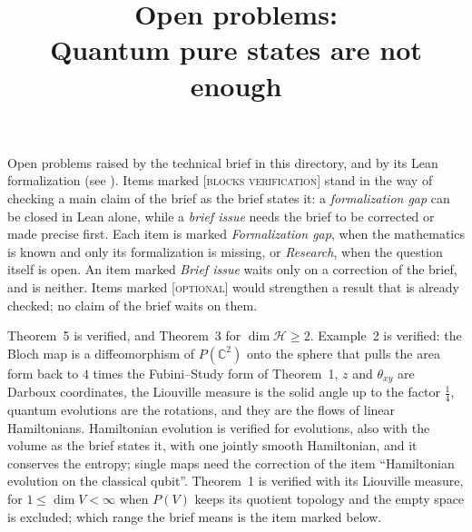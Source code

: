 \documentclass[11pt]{article}
\title{Open problems:\\ Quantum pure states are not enough}
\author{}
\date{}
\begin{document}
\maketitle

\noindent
Open problems raised by the technical brief in this directory, and by its Lean formalization
(see ).
Items marked \textsc{[blocks verification]} stand in the way of checking a main
claim of the brief as the brief states it: a \emph{formalization gap} can be closed
in Lean alone, while a \emph{brief issue} needs the brief to be corrected or made
precise first.
Each item is marked \emph{Formalization gap}, when the mathematics is known and only its
formalization is missing, or \emph{Research}, when the question itself is open. An item marked \emph{Brief issue} waits only on a correction of the
brief, and is neither. Items marked \textsc{[optional]} would strengthen a result that is already
checked; no claim of the brief waits on them.

Theorem~5 is verified, and Theorem~3 for $\dim\mathcal H \ge 2$. Example~2 is verified: the Bloch
map is a diffeomorphism of $P(\mathbb C^2)$ onto the sphere that pulls the area form back to $4$
times the Fubini--Study form of Theorem~1, $z$ and $\theta_{xy}$ are Darboux coordinates, the
Liouville measure is the solid angle up to the factor $\frac14$, quantum evolutions are the
rotations, and they are the flows of linear Hamiltonians. Hamiltonian evolution is verified for
evolutions, also with the volume as the brief states it, with one jointly smooth Hamiltonian, and
it conserves the entropy; single maps need the correction of the item ``Hamiltonian evolution on
the classical qubit''. Theorem~1 is verified with its Liouville measure, for $1 \le \dim V < \infty$ when $P(V)$
keeps its quotient topology and the empty space is excluded; which range the brief means is the
item marked below.
\end{document}
